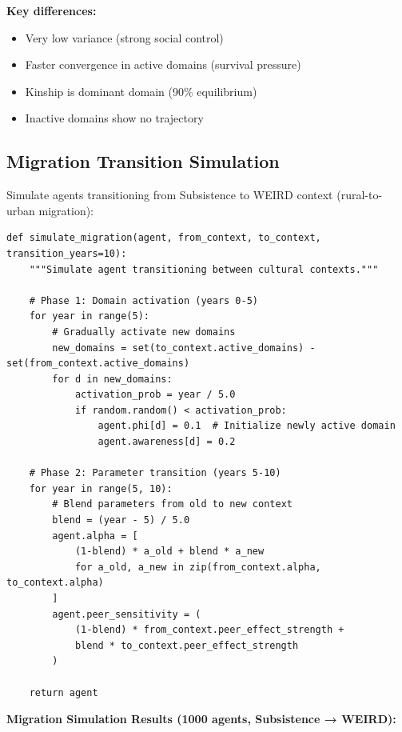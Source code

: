 \textbf{Key differences:}
\begin{itemize}[nosep]
\item Very low variance (strong social control)
\item Faster convergence in active domains (survival pressure)
\item Kinship is dominant domain (90\% equilibrium)
\item Inactive domains show no trajectory
\end{itemize}

\subsection{Migration Transition Simulation}

Simulate agents transitioning from Subsistence to WEIRD context (rural-to-urban migration):

\begin{verbatim}
def simulate_migration(agent, from_context, to_context, transition_years=10):
    """Simulate agent transitioning between cultural contexts."""

    # Phase 1: Domain activation (years 0-5)
    for year in range(5):
        # Gradually activate new domains
        new_domains = set(to_context.active_domains) - set(from_context.active_domains)
        for d in new_domains:
            activation_prob = year / 5.0
            if random.random() < activation_prob:
                agent.phi[d] = 0.1  # Initialize newly active domain
                agent.awareness[d] = 0.2

    # Phase 2: Parameter transition (years 5-10)
    for year in range(5, 10):
        # Blend parameters from old to new context
        blend = (year - 5) / 5.0
        agent.alpha = [
            (1-blend) * a_old + blend * a_new
            for a_old, a_new in zip(from_context.alpha, to_context.alpha)
        ]
        agent.peer_sensitivity = (
            (1-blend) * from_context.peer_effect_strength +
            blend * to_context.peer_effect_strength
        )

    return agent
\end{verbatim}

\textbf{Migration Simulation Results (1000 agents, Subsistence → WEIRD):}


